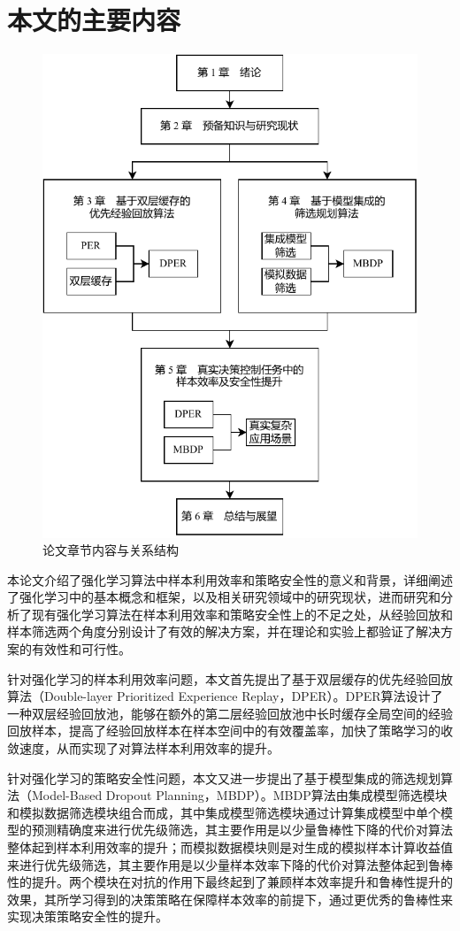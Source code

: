\section{本文的主要内容}

\begin{figure}[t]
  \centering
  \includegraphics[width=0.8\linewidth]{figures/paper-struc.pdf}
  \caption{论文章节内容与关系结构}
  \label{fig:paper-struc}
\end{figure}

本论文介绍了强化学习算法中样本利用效率和策略安全性的意义和背景，详细阐述了强化学习中的基本概念和框架，以及相关研究领域中的研究现状，进而研究和分析了现有强化学习算法在样本利用效率和策略安全性上的不足之处，从经验回放和样本筛选两个角度分别设计了有效的解决方案，并在理论和实验上都验证了解决方案的有效性和可行性。

针对强化学习的样本利用效率问题，本文首先提出了基于双层缓存的优先经验回放算法（Double-layer Prioritized Experience Replay，DPER）。DPER算法设计了一种双层经验回放池，能够在额外的第二层经验回放池中长时缓存全局空间的经验回放样本，提高了经验回放样本在样本空间中的有效覆盖率，加快了策略学习的收敛速度，从而实现了对算法样本利用效率的提升。

针对强化学习的策略安全性问题，本文又进一步提出了基于模型集成的筛选规划算法（Model-Based Dropout Planning，MBDP）。MBDP算法由集成模型筛选模块和模拟数据筛选模块组合而成，其中集成模型筛选模块通过计算集成模型中单个模型的预测精确度来进行优先级筛选，其主要作用是以少量鲁棒性下降的代价对算法整体起到样本利用效率的提升；而模拟数据模块则是对生成的模拟样本计算收益值来进行优先级筛选，其主要作用是以少量样本效率下降的代价对算法整体起到鲁棒性的提升。两个模块在对抗的作用下最终起到了兼顾样本效率提升和鲁棒性提升的效果，其所学习得到的决策策略在保障样本效率的前提下，通过更优秀的鲁棒性来实现决策策略安全性的提升。

